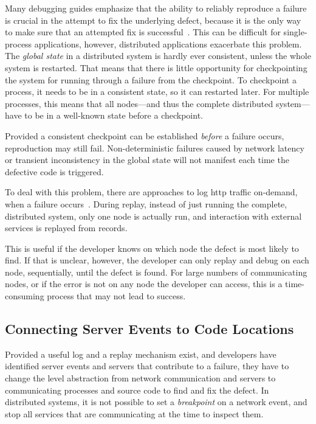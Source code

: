 Many debugging guides emphasize that the ability to reliably reproduce
a failure is crucial in the attempt to fix the underlying defect,
because it is the only way to make sure that an attempted fix is
successful~\cite{metzger2003Dbt,zeller2009programs,groetker2012Tdg}. This
can be difficult for single-process applications, however, distributed
applications exacerbate this problem. The \emph{global state} in a
distributed system is hardly ever consistent, unless the whole system
is restarted. That means that there is little opportunity for
checkpointing the system for running through a failure from the
checkpoint. To checkpoint a process, it needs to be in a consistent
state, so it can restarted later. For multiple processes, this means
that all nodes---and thus the complete distributed system---have to be
in a well-known state before a checkpoint.

Provided a consistent checkpoint can be established \emph{before} a
failure occurs, reproduction may still fail. Non-deterministic
failures caused by network latency or transient inconsistency in the
global state will not manifest each time the defective code is
triggered.

To deal with this problem, there are approaches to log \ac{http}
traffic on-demand, when a failure occurs~\cite{Konuru2000}. During
replay, instead of just running the complete, distributed system, only
one node is actually run, and interaction with external services is
replayed from records.

This is useful if the developer knows on which node the defect is most
likely to find. If that is unclear, however, the developer can only
replay and debug on each node, sequentially, until the defect is
found. For large numbers of communicating nodes, or if the error is
not on any node the developer can access, this is a time-consuming
process that may not lead to success.

\subsection{Connecting Server Events to Code Locations}
\label{sec:conn-serv-code}

Provided a useful log and a replay mechanism exist, and developers
have identified server events and servers that contribute to a
failure, they have to change the level abstraction from network
communication and servers to communicating processes and source code
to find and fix the defect. In distributed systems, it is not possible
to set a \emph{breakpoint} on a network event, and stop all services
that are communicating at the time to inspect them.

